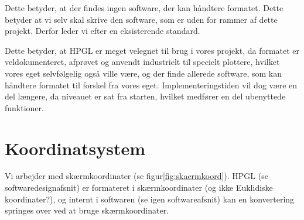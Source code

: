Dette betyder, at der findes ingen software, der kan håndtere
formatet. Dette betyder at vi selv skal skrive den software, som er
uden for rammer af dette projekt. Derfor leder vi efter en
eksisterende standard.


Dette betyder, at HPGL er meget velegnet til brug i vores projekt, da
formatet er veldokumenteret, afprøvet og anvendt industrielt til
specielt plottere, hvilket vores eget selvfølgelig også ville være, og
der finde allerede software, som kan håndtere formatet til forskel fra
vores eget. Implementeringstiden vil dog være en del længere, da
niveauet er sat fra starten, hvilket medfører en del ubenyttede
funktioner.


\section{Koordinatsystem}


Vi arbejder med skærmkoordinater (se
figur\vref{fig:skaermkoord}). HPGL (se
softwaredesignafsnit) er formateret i
skærmkoordinater (og ikke Euklidiske koordinater?),
og internt i softwaren (se igen
softwareafsnit) kan en konvertering
springes over ved at bruge skærmkoordinater.


